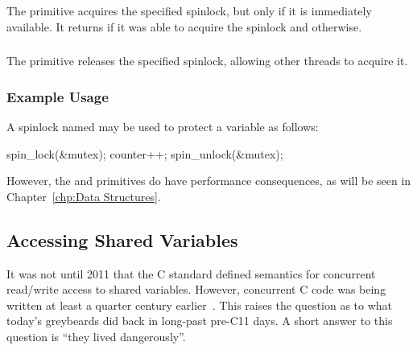 The  primitive acquires the specified spinlock,
but only if it is immediately available.
It returns  if it was able to acquire the spinlock and
 otherwise.

\subsubsection{}

The  primitive releases the specified spinlock,
allowing other threads to acquire it.


\subsubsection{Example Usage}

A spinlock named  may be used to protect a variable
 as follows:

\begin{VerbatimU}
spin_lock(&mutex);
counter++;
spin_unlock(&mutex);
\end{VerbatimU}

\QuickQuizEnd

However, the  and  primitives
do have performance consequences, as will be seen in
Chapter~\ref{chp:Data Structures}.

\subsection{Accessing Shared Variables}
\label{sec:toolsoftrade:Accessing Shared Variables}

It was not until 2011 that the C standard defined semantics for concurrent
read/write access to shared variables.
However, concurrent C code was being written at least a quarter century
earlier~\cite{Beck85,Inman85}.
This raises the question as to what today's greybeards did back
in long-past pre-C11 days.
A short answer to this question is ``they lived dangerously''.

